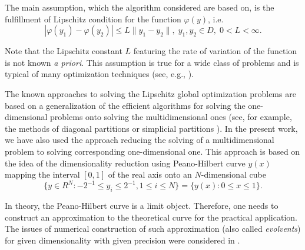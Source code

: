 \documentclass[runningheads]{llncs}
\begin{document}
The main assumption, which the algorithm considered are based on, is the fulfillment of Lipschitz condition for the function $\varphi(y)$, i.e.
\begin{equation} \label{lip_ref}
\left| \varphi(y_1) - \varphi(y_2) \right| \leq L\|y_1 - y_2\|, \; y_1, y_2 \in D, \; 0 < L < \infty.
\end{equation}

Note that the Lipschitz constant $L$ featuring the rate of variation of the function is not known \textit{a priori}. This assumption is true for a wide class of problems and is typical of many optimization techniques (see, e.g., \cite{Evtushenko2013,Jones2009,Paulavicius2014}).

The known approaches to solving the Lipschitz global optimization problems are based on a generalization of the efficient algorithms for solving the one-dimensional problems onto solving the multidimensional ones (see, for example, the methods of diagonal partitions \cite{Sergeyev2017} or simplicial partitions \cite{PaulaviciusZilinskas2014}). In the present work, we have also used the approach reducing the solving of a multidimensional problem to solving corresponding one-dimensional one. This approach is based on the idea of the dimensionality reduction using Peano-Hilbert curve $y(x)$ mapping the interval $[0,1]$ of the real axis onto an $N$-dimensional cube 
\begin{equation} \label{n_dem_cube_ref}
\{ y \in R^{N}: -2^{-1} \leq y_i \leq 2^{-1}, 1 \leq i \leq N\} = \{y(x): 0 \leq x \leq 1 \}.
\end{equation}

In theory, the Peano-Hilbert curve is a limit object. Therefore, one needs to construct an approximation to the theoretical curve for the practical application. The issues of numerical construction of such approximation (also called \textit{evolvents}) for given dimensionality with given precision were considered in \cite{Sergeyev2013}.
\end{document}
